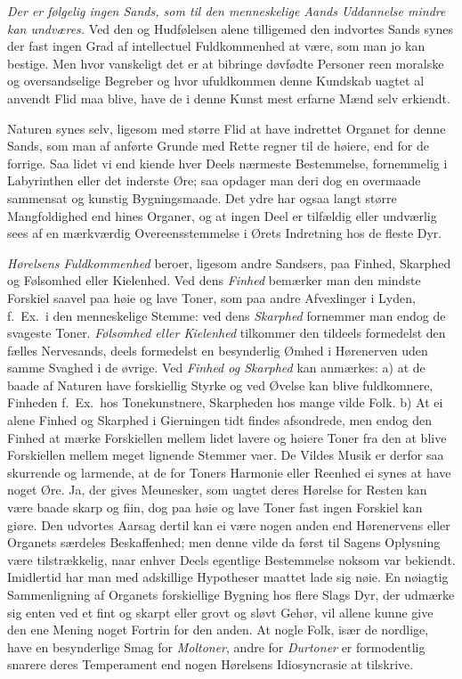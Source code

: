 \documentclass[12pt,a4paper]{article}
\newcommand{\opage}[1]{\marginnote{\footnotesize\textit{[#1]}}}
\begin{document}
\emph{Der er følgelig ingen Sands, som til den menneskelige Aands Uddannelse mindre kan
undværes.} Ved den og Hudfølelsen alene tilligemed den indvortes Sands synes der fast
ingen Grad af intellectuel Fuldkommenhed at være, som man jo kan bestige. Men hvor
vanskeligt det er at bibringe døvfødte Personer reen moralske og oversandselige
Begreber og hvor ufuldkommen denne Kundskab uagtet al anvendt Flid maa blive, have de i
denne Kunst mest erfarne Mænd selv erkiendt.

Naturen synes selv, ligesom med større Flid at have indrettet Organet for denne Sands,
som man af anførte Grunde med Rette regner til de høiere, end for de forrige. Saa lidet
vi end kiende hver Deels nærmeste Bestemmelse, fornemmelig i Labyrinthen eller det
\opage{70} inderste Øre; saa opdager man deri dog en overmaade sammensat og kunstig
Bygningsmaade. Det ydre har ogsaa langt større Mangfoldighed end hines Organer, og at
ingen Deel er tilfældig eller undværlig sees af en mærkværdig Overeensstemmelse i
Ørets Indretning hos de fleste Dyr.

\emph{Hørelsens Fuldkommenhed} beroer, ligesom andre Sandsers, paa Finhed, Skarphed og
Følsomhed eller Kielenhed. Ved dens \emph{Finhed} bemærker man den mindste Forskiel
saavel paa høie og lave Toner, som paa andre Afvexlinger i Lyden, f.~Ex.\ i den
menneskelige Stemme: ved dens \emph{Skarphed} fornemmer man endog de svageste Toner.
\emph{Følsomhed eller Kielenhed} tilkommer den tildeels formedelst den fælles
Nervesands, deels formedelst en besynderlig Ømhed i Hørenerven uden samme Svaghed i de
øvrige. Ved \emph{Finhed og Skarphed} kan anmærkes: a) at de baade af Naturen have
forskiellig Styrke og ved Øvelse kan blive fuldkomnere, Finheden f.~Ex.\ hos
Tonekunstnere, Skarpheden hos mange vilde Folk. b) At ei alene Finhed og Skarphed i
Gierningen tidt findes afsondrede, men endog den Finhed at mærke Forskiellen mellem
lidet lavere og høiere Toner fra den at blive Forskiellen mellem meget lignende
Stemmer vaer. De Vildes Musik er derfor saa skurrende og larmende, at de for Toners
Harmonie eller Reenhed ei synes at have noget Øre. Ja, der gives Meunesker, som uagtet
deres Hørelse
\opage{71} for Resten kan være baade skarp og fiin, dog paa høie og lave Toner fast ingen Forskiel
kan giøre. Den udvortes Aarsag dertil kan ei være nogen anden end Hørenervens eller
Organets særdeles Beskaffenhed; men denne vilde da først til Sagens Oplysning være
tilstrækkelig, naar enhver Deels egentlige Bestemmelse noksom var bekiendt. Imidlertid
har man med adskillige Hypotheser maattet lade sig nøie. En nøiagtig Sammenligning af
Organets forskiellige Bygning hos flere Slags Dyr, der udmærke sig enten ved et fint og
skarpt eller grovt og sløvt Gehør, vil allene kunne give den ene Mening noget Fortrin
for den anden. At nogle Folk, især de nordlige, have en besynderlige Smag for
\emph{Moltoner}, andre for \emph{Durtoner} er formodentlig snarere deres Temperament
end nogen Hørelsens Idiosyncrasie at tilskrive.
\end{document}
